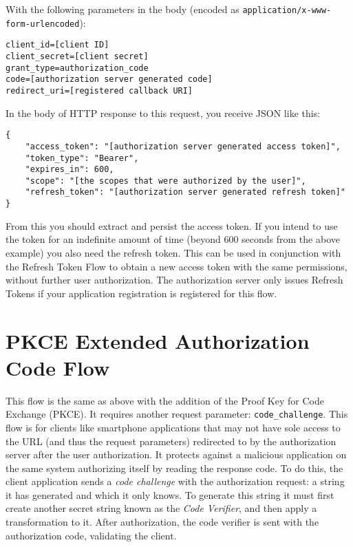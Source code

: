 With the following parameters in the body (encoded as
\texttt{application/x-www-form-urlencoded}):

\begin{verbatim}
client_id=[client ID]
client_secret=[client secret]
grant_type=authorization_code
code=[authorization server generated code]
redirect_uri=[registered callback URI]
\end{verbatim}

In the body of HTTP response to this request, you receive JSON like
this:

\begin{verbatim}
{
    "access_token": "[authorization server generated access token]",
    "token_type": "Bearer",
    "expires_in": 600,
    "scope": "[the scopes that were authorized by the user]",
    "refresh_token": "[authorization server generated refresh token]"
}
\end{verbatim}

From this you should extract and persist the access token. If you intend
to use the token for an indefinite amount of time (beyond 600 seconds
from the above example) you also need the refresh token. This can be
used in conjunction with the Refresh Token Flow to obtain a new access
token with the same permissions, without further user authorization. The
authorization server only issues Refresh Tokens if your application
registration is registered for this flow.

\section{PKCE Extended Authorization Code
Flow}\label{pkce-extended-authorization-code-flow}

This flow is the same as above with the addition of the Proof Key for
Code Exchange (PKCE). It requires another request parameter:
\texttt{code\_challenge}. This flow is for clients like smartphone
applications that may not have sole access to the URL (and thus the
request parameters) redirected to by the authorization server after the
user authorization. It protects against a malicious application on the
same system authorizing itself by reading the response code. To do this,
the client application sends a \emph{code challenge} with the
authorization request: a string it has generated and which it only
knows. To generate this string it must first create another secret
string known as the \emph{Code Verifier}, and then apply a
transformation to it. After authorization, the code verifier is sent
with the authorization code, validating the client.

